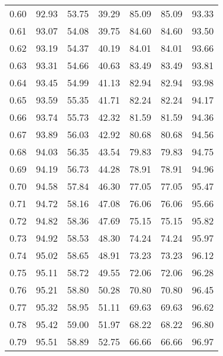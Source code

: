 \begin{tabular}{|c|c|c|c|c|c|c|}
      0.60 &     92.93 &     53.75 &      39.29 &   85.09 &      85.09 &         93.33 \\
      0.61 &     93.07 &     54.08 &      39.75 &   84.60 &      84.60 &         93.50 \\
      0.62 &     93.19 &     54.37 &      40.19 &   84.01 &      84.01 &         93.66 \\
      0.63 &     93.31 &     54.66 &      40.63 &   83.49 &      83.49 &         93.81 \\
      0.64 &     93.45 &     54.99 &      41.13 &   82.94 &      82.94 &         93.98 \\
      0.65 &     93.59 &     55.35 &      41.71 &   82.24 &      82.24 &         94.17 \\
      0.66 &     93.74 &     55.73 &      42.32 &   81.59 &      81.59 &         94.36 \\
      0.67 &     93.89 &     56.03 &      42.92 &   80.68 &      80.68 &         94.56 \\
      0.68 &     94.03 &     56.35 &      43.54 &   79.83 &      79.83 &         94.75 \\
      0.69 &     94.19 &     56.73 &      44.28 &   78.91 &      78.91 &         94.96 \\
      0.70 &     94.58 &     57.84 &      46.30 &   77.05 &      77.05 &         95.47 \\
      0.71 &     94.72 &     58.16 &      47.08 &   76.06 &      76.06 &         95.66 \\
      0.72 &     94.82 &     58.36 &      47.69 &   75.15 &      75.15 &         95.82 \\
      0.73 &     94.92 &     58.53 &      48.30 &   74.24 &      74.24 &         95.97 \\
      0.74 &     95.02 &     58.65 &      48.91 &   73.23 &      73.23 &         96.12 \\
      0.75 &     95.11 &     58.72 &      49.55 &   72.06 &      72.06 &         96.28 \\
      0.76 &     95.21 &     58.80 &      50.28 &   70.80 &      70.80 &         96.45 \\
      0.77 &     95.32 &     58.95 &      51.11 &   69.63 &      69.63 &         96.62 \\
      0.78 &     95.42 &     59.00 &      51.97 &   68.22 &      68.22 &         96.80 \\
      0.79 &     95.51 &     58.89 &      52.75 &   66.66 &      66.66 &         96.97 \\

\end{tabular}
